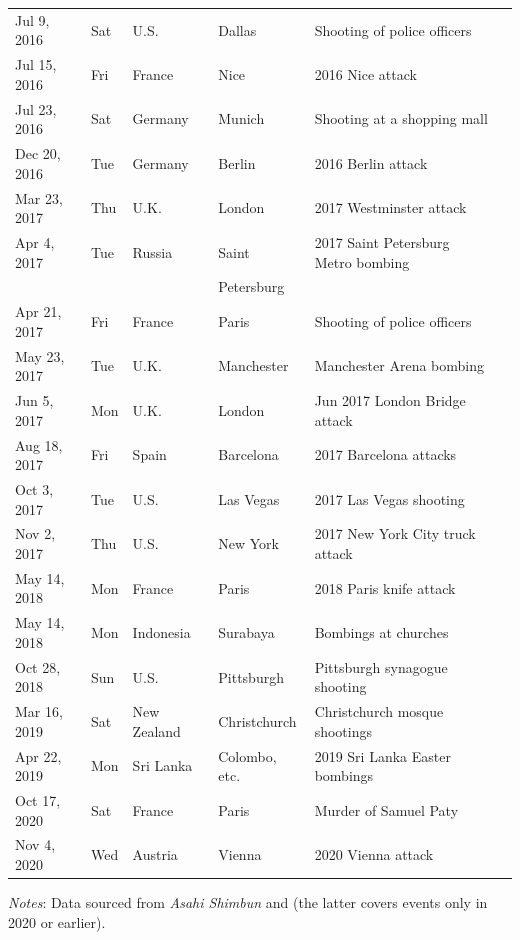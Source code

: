 \documentclass[12pt,letterpaper]{scrartcl}
\begin{document}
\begin{longtable}[c]{lllllr}
Jul 9, 2016 & Sat & U.S. & Dallas & Shooting of police officers \\
Jul 15, 2016 & Fri & France & Nice & 2016 Nice attack \\
Jul 23, 2016 & Sat & Germany & Munich & Shooting at a shopping mall \\
Dec 20, 2016 & Tue & Germany & Berlin & 2016 Berlin attack \\
Mar 23, 2017 & Thu & U.K. & London & 2017 Westminster attack \\
Apr 4, 2017 & Tue & Russia & Saint & 2017 Saint Petersburg Metro bombing \\
 & & & \hspace{0.5em}Petersburg & \\
Apr 21, 2017 & Fri & France  & Paris  & Shooting of police officers \\
May 23, 2017 & Tue & U.K. & Manchester & Manchester Arena bombing \\
Jun 5, 2017 & Mon & U.K. & London & Jun 2017 London Bridge attack \\
Aug 18, 2017 & Fri & Spain & Barcelona & 2017 Barcelona attacks \\
Oct 3, 2017 & Tue & U.S. & Las Vegas & 2017 Las Vegas shooting \\
Nov 2, 2017 & Thu & U.S. & New York & 2017 New York City truck attack \\
May 14, 2018 & Mon & France & Paris & 2018 Paris knife attack \\
May 14, 2018 & Mon & Indonesia & Surabaya & Bombings at churches \\
Oct 28, 2018 & Sun & U.S. & Pittsburgh & Pittsburgh synagogue shooting \\
Mar 16, 2019 & Sat & New Zealand & Christchurch & Christchurch mosque shootings \\
Apr 22, 2019 & Mon & Sri Lanka & Colombo, etc. & 2019 Sri Lanka Easter bombings \\
Oct 17, 2020 & Sat & France & Paris & Murder of Samuel Paty \\
Nov 4, 2020 & Wed & Austria & Vienna & 2020 Vienna attack \\
\end{longtable}

\noindent \emph{Notes}: Data sourced from \emph{Asahi Shimbun} and  \citeyearpar{START2022} (the latter covers events only in 2020 or earlier).

\end{document}
